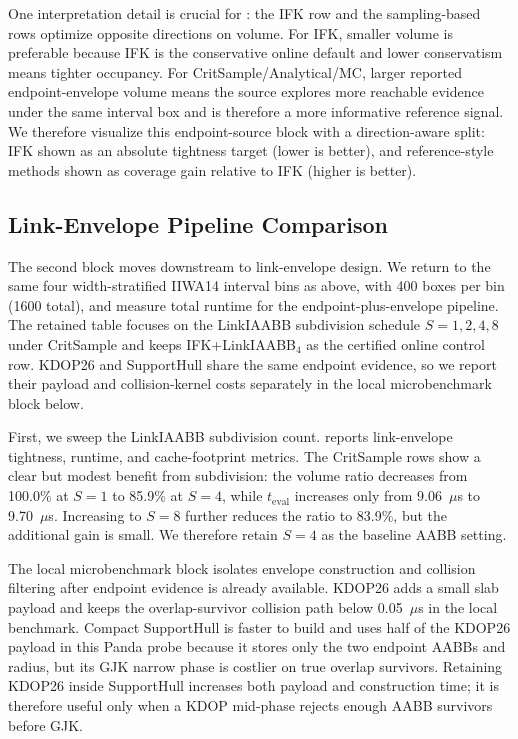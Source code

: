 \documentclass[journal]{IEEEtran}
\begin{document}
One interpretation detail is crucial for : the IFK
row and the sampling-based rows optimize opposite directions on volume. For
IFK, smaller volume is preferable because IFK is the conservative online default
and lower conservatism means tighter occupancy. For
CritSample/Analytical/MC, larger reported endpoint-envelope volume means the
source explores more reachable evidence under the same interval box and is
therefore a more informative reference signal. We therefore visualize this endpoint-source block with a
direction-aware split: IFK shown as an absolute tightness target (lower is
better), and reference-style methods shown as coverage gain relative to IFK
(higher is better).



\subsection{Link-Envelope Pipeline Comparison}\label{sec:exp_linkenv}



The second block moves downstream to link-envelope design. We return to the
same four width-stratified IIWA14 interval bins as above, with 400 boxes per
bin (1600 total), and measure total runtime for the endpoint-plus-envelope
pipeline. The retained table focuses on the LinkIAABB subdivision schedule
$S=1,2,4,8$ under CritSample and keeps IFK+LinkIAABB$_4$ as the certified
online control row. KDOP26 and SupportHull share the same endpoint evidence, so
we report their payload and collision-kernel costs separately in the local
microbenchmark block below.

First, we sweep the LinkIAABB subdivision count.
 reports link-envelope tightness, runtime,
and cache-footprint metrics. The CritSample rows show a clear but modest
benefit from subdivision: the volume ratio decreases from 100.0\% at $S=1$ to
85.9\% at $S=4$, while $t_{\mathrm{eval}}$ increases only from
9.06~$\mu$s to 9.70~$\mu$s. Increasing to $S=8$ further reduces the ratio to
83.9\%, but the additional gain is small. We therefore retain $S=4$ as the
baseline AABB setting.




The local microbenchmark block isolates envelope construction and
collision filtering after endpoint evidence is already available. KDOP26 adds a
small slab payload and keeps the overlap-survivor collision path below
0.05~$\mu$s in the local benchmark. Compact SupportHull is faster to build and
uses half of the KDOP26 payload in this Panda probe because it stores only the
two endpoint AABBs and radius, but its GJK narrow phase is costlier on true
overlap survivors. Retaining KDOP26 inside SupportHull increases both payload
and construction time; it is therefore useful only when a KDOP mid-phase rejects
enough AABB survivors before GJK.
\end{document}
